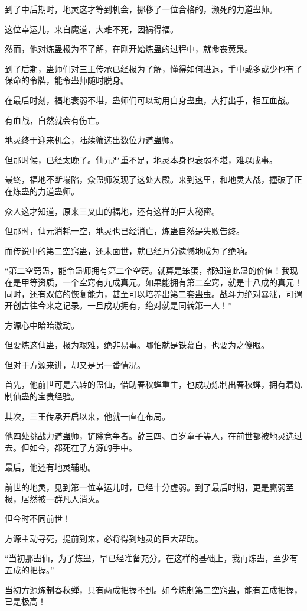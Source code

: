 \begin{this_body}
到了中后期时，地灵这才等到机会，挪移了一位合格的，濒死的力道蛊师。

这位幸运儿，来自魔道，大难不死，因祸得福。

然而，他对炼蛊极为不了解，在刚开始炼蛊的过程中，就命丧黄泉。

到了后期，蛊师们对三王传承已经极为了解，懂得如何进退，手中或多或少也有了保命的令牌，能令蛊师随时脱身。

在最后时刻，福地衰弱不堪，蛊师们可以动用自身蛊虫，大打出手，相互血战。

有血战，自然就会有伤亡。

地灵终于迎来机会，陆续筛选出数位力道蛊师。

但那时候，已经太晚了。仙元严重不足，地灵本身也衰弱不堪，难以成事。

最终，福地不断塌陷，众蛊师发现了这处大殿。来到这里，和地灵大战，撞破了正在炼蛊的力道蛊师。

众人这才知道，原来三叉山的福地，还有这样的巨大秘密。

但那时，仙元消耗一空，地灵也已经消亡，炼蛊自然是失败告终。

而传说中的第二空窍蛊，还未面世，就已经万分遗憾地成为了绝响。

“第二空窍蛊，能令蛊师拥有第二个空窍。就算是笨蛋，都知道此蛊的价值！我现在是甲等资质，一个空窍有九成真元。如果能拥有第二空窍，就是十八成的真元！同时，还有双倍的恢复能力，甚至可以培养出第二套蛊虫。战斗力绝对暴涨，可谓开创古往今来之记录。一旦成功拥有，绝对就是同转第一人！”

方源心中暗暗激动。

但要炼这仙蛊，极为艰难，绝非易事。哪怕就是铁慕白，也要为之傻眼。

但对于方源来讲，却又是另一番情况。

首先，他前世可是六转的蛊仙，借助春秋蝉重生，也成功炼制出春秋蝉，拥有着炼制仙蛊的宝贵经验。

其次，三王传承开启以来，他就一直在布局。

他四处挑战力道蛊师，铲除竞争者。薛三四、百岁童子等人，在前世都被地灵选过去。但如今，都死在了方源的手中。

最后，他还有地灵辅助。

前世的地灵，见到第一位幸运儿时，已经十分虚弱。到了最后时期，更是羸弱至极，居然被一群凡人消灭。

但今时不同前世！

方源主动寻死，提前到来，必将得到地灵的巨大帮助。

“当初那蛊仙，为了炼蛊，早已经准备充分。在这样的基础上，我再炼蛊，至少有五成的把握。”

当初方源炼制春秋蝉，只有两成把握不到。如今炼制第二空窍蛊，能有五成把握，已是极高！

\end{this_body}

